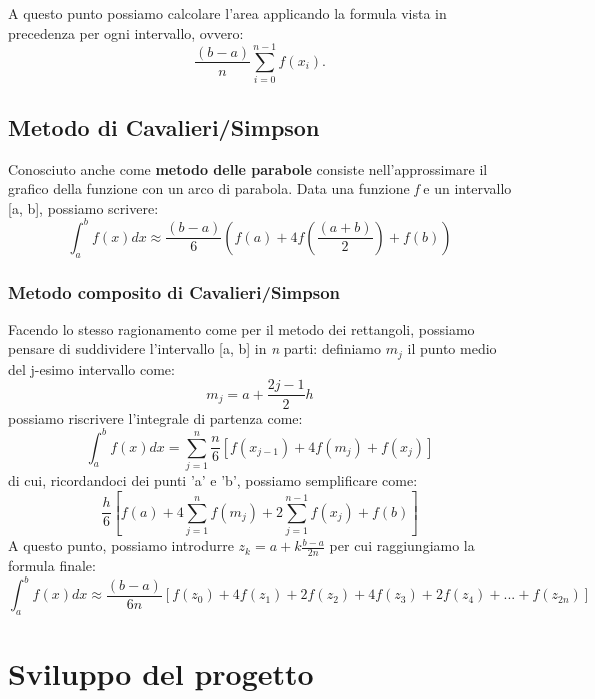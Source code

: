 \documentclass{article}
\begin{document}
A questo punto possiamo calcolare l'area applicando la formula vista in precedenza per ogni intervallo, ovvero:
\begin{equation*}
   \frac{(b-a)}{n} \sum_{i=0}^{n-1} f(x_i).
\end{equation*}

\subsection{Metodo di Cavalieri/Simpson}
Conosciuto anche come \textbf{metodo delle parabole} consiste nell'approssimare il grafico della funzione con un arco di parabola. Data una funzione \textit{f} e un intervallo 
[a, b], possiamo scrivere:
\begin{equation*}
   \int_{a}^{b} f(x) dx \approx \frac{(b-a)}{6} \left( f(a)+4f\left(\frac{(a+b)}{2} \right) + f(b) \right)
\end{equation*}
\subsubsection{Metodo composito di Cavalieri/Simpson}
Facendo lo stesso ragionamento come per il metodo dei rettangoli, possiamo pensare di suddividere l'intervallo [a, b] in \textit{n} parti: definiamo $m_j$ il punto medio del 
j-esimo intervallo come:
\begin{equation*}
   m_j = a + \frac{2j-1}{2}h
\end{equation*}
possiamo riscrivere l'integrale di partenza come:
\begin{equation*}
   \int_{a}^{b} f(x) dx = \sum_{j=1}^{n} \frac{n}{6} [f(x_{j-1}) +4f(m_j) + f(x_j)]
\end{equation*}
di cui, ricordandoci dei punti 'a' e 'b', possiamo semplificare come:
\begin{equation*}
   \frac{h}{6} \left[ f(a) + 4 \sum_{j=1}^{n} f(m_j) + 2 \sum_{j=1}^{n-1} f(x_j) + f(b)\right]
\end{equation*}
A questo punto, possiamo introdurre $z_k = a + k \frac{b-a}{2n}$ per cui raggiungiamo la formula finale:
\begin{equation*}
   \int_{a}^{b} f(x) dx \approx \frac{(b-a)}{6n} [f(z_0) + 4 f(z_1) + 2f(z_2) + 4f(z_3) + 2f(z_4) + ... + f(z_{2n})]
\end{equation*}

\newpage
\section{Sviluppo del progetto}
\end{document}
